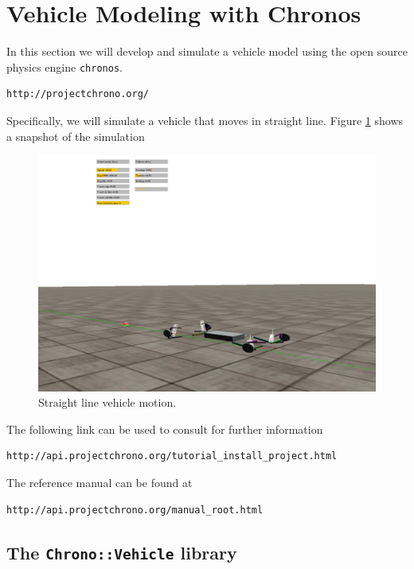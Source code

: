 \section{Vehicle Modeling with Chronos}
\label{vehicle_modeling_chronos}

In this section we will develop and simulate a vehicle model using the open source physics engine \lstinline{chronos}.

\begin{lstlisting}
http://projectchrono.org/
\end{lstlisting}
 
Specifically, we will simulate a vehicle that moves in straight line.  Figure \ref{straight_line_motion} shows a snapshot of the simulation

\begin{figure}[!htb]
\begin{center}
\includegraphics[scale=0.290]{img/straight_line_motion.png}
\end{center}
\caption{Straight line vehicle motion.}
\label{straight_line_motion}
\end{figure}

The following link can be used to consult for further information 
\begin{lstlisting}
http://api.projectchrono.org/tutorial_install_project.html
\end{lstlisting}

The reference manual can be found at
\begin{lstlisting}
http://api.projectchrono.org/manual_root.html
\end{lstlisting}
\subsection{The \lstinline{Chrono::Vehicle} library}

